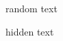 \documentclass[ignorenonframetext]{beamer}
\begin{document}
\begin{frame}
random text
\end{frame} 

hidden text
\end{document}
